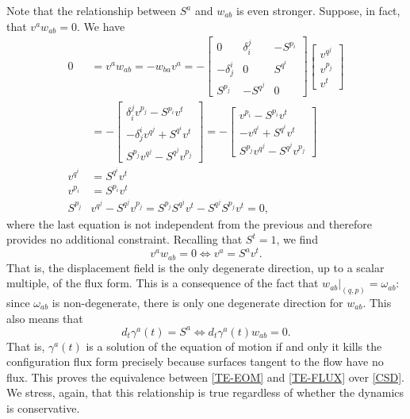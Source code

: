 \documentclass[12pt]{article}
\begin{document}
Note that the relationship between $S^a$ and $w_{ab}$ is even stronger. Suppose, in fact, that $v^a w_{ab} = 0$. We have
\begin{equation}
    \begin{aligned}
        0 &= v^a w_{ab} = - w_{ba} v^a = - \begin{bmatrix}
            0 & \delta_i^j & -S^{p_i} \\
            -\delta_j^i & 0 & S^{q^i} \\
            S^{p_j} & -S^{q^j} & 0
        \end{bmatrix} \begin{bmatrix}
            v^{q^j} \\ v^{p_j} \\ v^{t} 
        \end{bmatrix} \\
        &= - \begin{bmatrix}
            \delta_i^j v^{p_j} -S^{p_i} v^t  \\ -\delta_j^i v^{q^j} + S^{q^i} v^t \\ S^{p_j}v^{q^j} -S^{q^j}v^{p_j} 
        \end{bmatrix} = - \begin{bmatrix}
            v^{p_i} -S^{p_i} v^t  \\
            - v^{q^i} + S^{q^i} v^t \\
            S^{p_j}v^{q^j} -S^{q^j}v^{p_j} 
        \end{bmatrix} \\
        v^{q^i} &= S^{q^i} v^t \\
        v^{p_i} &= S^{p_i} v^t \\
        S^{p_j}&v^{q^j} -S^{q^j}v^{p_j} = S^{p_j}S^{q^j} v^t -S^{q^j}S^{p_j} v^t = 0,
    \end{aligned}
\end{equation}
where the last equation is not independent from the previous and therefore provides no additional constraint. Recalling that $S^t = 1$, we find
\begin{equation}
    v^a w_{ab} = 0 \iff v^a = S^a v^t.
\end{equation}
That is, the displacement field is the only degenerate direction, up to a scalar multiple, of the flux form. This is a consequence of the fact that $w_{ab}|_{(q,p)} = \omega_{ab}$: since $\omega_{ab}$ is non-degenerate, there is only one degenerate direction for $w_{ab}$. This also means that
\begin{equation}\label{evolutionsKillFlux}
    d_t \gamma^a(t) = S^a  \iff d_t \gamma^a(t) w_{ab} = 0.
\end{equation}
That is, $\gamma^a(t)$ is a solution of the equation of motion if and only it kills the configuration flux form precisely because surfaces tangent to the flow have no flux. This proves the equivalence between \ref{TE-EOM} and \ref{TE-FLUX} over \ref{CSD}. We stress, again, that this relationship is true regardless of whether the dynamics is conservative.
\end{document}
